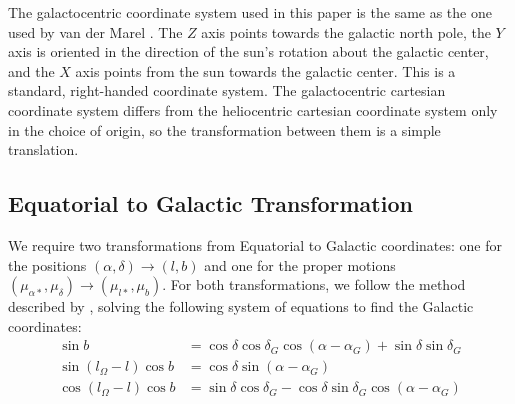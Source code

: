\documentclass[iop,apj,twocolappendix,numberedappendix]{emulateapj}
\begin{document}
\par The galactocentric coordinate system used in this paper is the same as the one used by van der Marel \citep{VdM08}.  The $Z$ axis points towards the galactic north pole, the $Y$ axis is oriented in the direction of the sun's rotation about the galactic center, and the $X$ axis points from the sun towards the galactic center. This is a standard, right-handed coordinate system. The galactocentric cartesian coordinate system differs from the heliocentric cartesian coordinate system only in the choice of origin, so the transformation between them is a simple translation.

\subsection{Equatorial to Galactic Transformation}
\label{sec:eq_to_gal}
\par 
We require two transformations from Equatorial to Galactic coordinates: one for the positions $(\alpha, \delta)\rightarrow (l,b)$ and one for the proper motions $(\mu_{\alpha*}, \mu_{\delta})\rightarrow (\mu_{l*}, \mu_{b})$. For both transformations, we follow the method described by \cite{poleski2013}, solving the following system of equations to find the Galactic coordinates:
\begin{equation}
\begin{aligned}
\sin b &= \cos\delta\cos\delta_{G}\cos(\alpha - \alpha_{G}) + \sin\delta\sin\delta_{G} \\
\sin(l_{\Omega} - l)\cos b &= \cos\delta\sin(\alpha - \alpha_{G}) \\
\cos(l_{\Omega} - l)\cos b &= \sin\delta\cos\delta_{G} - \cos\delta\sin\delta_{G}\cos(\alpha - \alpha_{G})
\end{aligned}
\end{equation}
\end{document}
